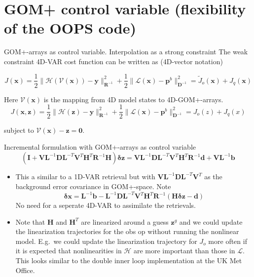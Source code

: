 \documentclass[9pt]{beamer}
\newcommand{\op}[1]{\mathrm{\mathbf{#1}}}
\renewcommand{\vec}[1]{\mathrm{\mathbf{#1}}}
\begin{document}
\section{GOM+ control variable (flexibility of the OOPS code)}
\begin{frame}{GOM+-arrays as control variable. Interpolation as a strong constraint}
The weak constraint 4D-VAR cost function can be written as (4D-vector notation)

$$  J(\vec{x}) =  \frac{1}{2}\|\mathcal{H}(\mathcal{V}(\vec{x}))-\vec{y}\|^2_{\op{R}^{-1}} +  \frac{1}{2}\|\mathcal{L}(\vec{x}) - \vec{p}^b\|^2_{\op{D}^{-1}}  = \tilde{J}_o(\vec{x}) + J_q(\vec{x})$$

Here $\mathcal{V}(\vec{x})$ is the mapping from 4D model states to 4D-GOM+-arrays.
\pause
$$J(\vec{x},\vec{z}) =  \frac{1}{2}\|\mathcal{H}(\vec{z})-\vec{y}\|^2_{\op{R}^{-1}} +  \frac{1}{2}\|\mathcal{L}(\vec{x}) - \vec{p}^b\|^2_{\op{D}^{-1}} = J_o(z) + J_q(x)$$

subject to  $\mathcal{V}(\vec{x}) - \vec{z} = \vec{0}$.


\pause

Incremental formulation with GOM+-arrays as control variable
\begin{equation}
  \left( \op{I} + \op{V} \op{L}^{-1} \op{D} \op{L}^{-T} \op{V}^T \op{H}^T \op{R}^{-1} \op{H} \right) \vec{\delta z} =  \op{V} \op{L}^{-1} \op{D} \op{L}^{-T} \op{V}^T \op{H}^T \op{R}^{-1}\op{d} + \op{V}\op{L}^{-1} \vec{b} \label{eq:sc}
\end{equation}

\begin{itemize}
\item This a similar to a 1D-VAR retrieval but with $\op{V} \op{L}^{-1} \op{D} \op{L}^{-T} \op{V}^T$ as the background error covariance in GOM+-space. Note 
$$\vec{\delta x}  =  \op{L}^{-1} \vec{b}  - \op{L}^{-1}   \op{D} \op{L}^{-T}  \op{V}^T \op{H}^{T} \op{R}^{-1}( \op{H}\vec{\delta z} -\vec{d})  $$
No need for a seperate 4D-VAR to assimilate the retrievals. 
\item Note that $\op{H}$ and $\op{H}^T$ are linearized around a guess $\vec{z}^g$ and we could update the linearization trajectories for the obs op without running the nonlinear model. E.g.\ we could update the linearization trajectory for $J_o$ more often if it is expected that nonlinearities in $\mathcal{H}$ are more important than those in $\mathcal{L}$. This looks similar to the double inner loop implementation at the UK Met Office.
\end{itemize}
\end{frame}
\end{document}
